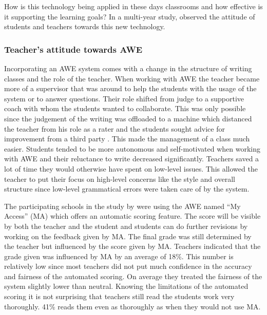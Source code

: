 \documentclass[runningheads]{llncs}
\begin{document}
How is this technology being applied in these days classrooms and how effective is it supporting the learning goals? In a multi-year study, \textcite{grimes_utility_2010} observed the attitude of students and teachers towards this new technology. 

\subsubsection{Teacher's attitude towards AWE}
Incorporating an AWE system comes with a change in the structure of writing classes and the role of the teacher. When working with AWE the teacher became more of a supervisor that was around to help the students with the usage of the system or to answer questions. Their role shifted from judge to a supportive coach with whom the students wanted to collaborate. This was only possible since the judgement of the writing was offloaded to a machine which distanced the teacher from his role as a rater and the students sought advice for improvement from a third party \citep{grimes_utility_2010}. This made the management of a class much easier. Students tended to be more autonomous and self-motivated when working with AWE and their reluctance to write decreased significantly. Teachers saved a lot of time they would otherwise have spent on low-level issues. This allowed the teacher to put their focus on high-level concerns like the style and overall structure since low-level grammatical errors were taken care of by the system.

The participating schools in the study by \textcite{grimes_utility_2010} were using the AWE named ``My Access'' (MA) which offers an automatic scoring feature. The score will be visible by both the teacher and the student and students can do further revisions by working on the feedback given by MA. The final grade was still determined by the teacher but influenced by the score given by MA. Teachers indicated that the grade given was influenced by MA by an average of 18\%. This number is relatively low since most teachers did not put much confidence in the accuracy and fairness of the automated scoring. On average they treated the fairness of the system slightly lower than neutral. Knowing the limitations of the automated scoring it is not surprising that teachers still read the students work very thoroughly. 41\% reads them even as thoroughly as when they would not use MA. 
\end{document}
